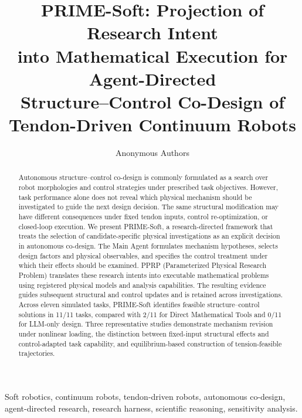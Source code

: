 \documentclass[journal]{IEEEtran}
\title{PRIME-Soft: Projection of Research Intent\\into Mathematical Execution for Agent-Directed\\Structure--Control Co-Design of\\Tendon-Driven Continuum Robots}
\author{Anonymous Authors}
\begin{document}
\raggedbottom
\setcounter{dbltopnumber}{2}
\setcounter{topnumber}{2}
\renewcommand{\dbltopfraction}{0.90}
\renewcommand{\textfraction}{0.15}
\renewcommand{\dblfloatpagefraction}{0.85}
\renewcommand{\floatpagefraction}{0.85}
\setlength{\textfloatsep}{8pt plus 2pt minus 2pt}
\setlength{\dbltextfloatsep}{8pt plus 2pt minus 2pt}
\setlength{\floatsep}{8pt plus 2pt minus 2pt}
\setlength{\dblfloatsep}{8pt plus 2pt minus 2pt}
\setlength{\intextsep}{8pt plus 2pt minus 2pt}
\maketitle
\begin{abstract}
Autonomous structure--control co-design is commonly formulated as a search over robot morphologies and control strategies under prescribed task objectives. However, task performance alone does not reveal which physical mechanism should be investigated to guide the next design decision. The same structural modification may have different consequences under fixed tendon inputs, control re-optimization, or closed-loop execution. We present PRIME-Soft, a research-directed framework that treats the selection of candidate-specific physical investigations as an explicit decision in autonomous co-design. The Main Agent formulates mechanism hypotheses, selects design factors and physical observables, and specifies the control treatment under which their effects should be examined. PPRP (Parameterized Physical Research Problem) translates these research intents into executable mathematical problems using registered physical models and analysis capabilities. The resulting evidence guides subsequent structural and control updates and is retained across investigations. Across eleven simulated tasks, PRIME-Soft identifies feasible structure--control solutions in 11/11 tasks, compared with 2/11 for Direct Mathematical Tools and 0/11 for LLM-only design. Three representative studies demonstrate mechanism revision under nonlinear loading, the distinction between fixed-input structural effects and control-adapted task capability, and equilibrium-based construction of tension-feasible trajectories.
\end{abstract}
\begin{IEEEkeywords}
Soft robotics, continuum robots, tendon-driven robots, autonomous co-design, agent-directed research, research harness, scientific reasoning, sensitivity analysis.
\end{IEEEkeywords}


\end{document}
